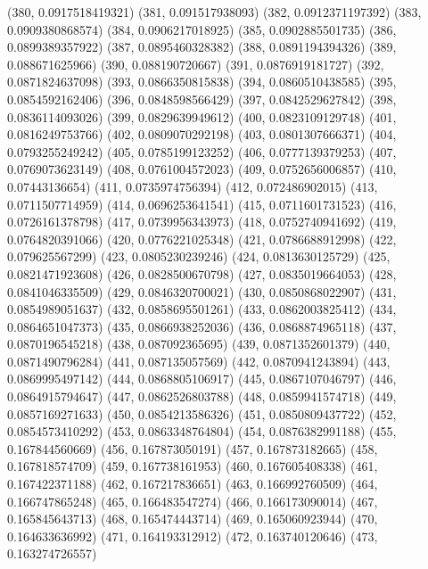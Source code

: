 {					(380, 0.0917518419321)
					(381, 0.091517938093)
					(382, 0.0912371197392)
					(383, 0.0909380868574)
					(384, 0.0906217018925)
					(385, 0.0902885501735)
					(386, 0.0899389357922)
					(387, 0.0895460328382)
					(388, 0.0891194394326)
					(389, 0.088671625966)
					(390, 0.088190720667)
					(391, 0.0876919181727)
					(392, 0.0871824637098)
					(393, 0.0866350815838)
					(394, 0.0860510438585)
					(395, 0.0854592162406)
					(396, 0.0848598566429)
					(397, 0.0842529627842)
					(398, 0.0836114093026)
					(399, 0.0829639949612)
					(400, 0.0823109129748)
					(401, 0.0816249753766)
					(402, 0.0809070292198)
					(403, 0.0801307666371)
					(404, 0.0793255249242)
					(405, 0.0785199123252)
					(406, 0.0777139379253)
					(407, 0.0769073623149)
					(408, 0.0761004572023)
					(409, 0.0752656006857)
					(410, 0.07443136654)
					(411, 0.0735974756394)
					(412, 0.072486902015)
					(413, 0.0711507714959)
					(414, 0.0696253641541)
					(415, 0.0711601731523)
					(416, 0.0726161378798)
					(417, 0.0739956343973)
					(418, 0.0752740941692)
					(419, 0.0764820391066)
					(420, 0.0776221025348)
					(421, 0.0786688912998)
					(422, 0.079625567299)
					(423, 0.0805230239246)
					(424, 0.0813630125729)
					(425, 0.0821471923608)
					(426, 0.0828500670798)
					(427, 0.0835019664053)
					(428, 0.0841046335509)
					(429, 0.0846320700021)
					(430, 0.0850868022907)
					(431, 0.0854989051637)
					(432, 0.0858695501261)
					(433, 0.0862003825412)
					(434, 0.0864651047373)
					(435, 0.0866938252036)
					(436, 0.0868874965118)
					(437, 0.0870196545218)
					(438, 0.087092365695)
					(439, 0.0871352601379)
					(440, 0.0871490796284)
					(441, 0.087135057569)
					(442, 0.0870941243894)
					(443, 0.0869995497142)
					(444, 0.0868805106917)
					(445, 0.0867107046797)
					(446, 0.0864915794647)
					(447, 0.0862526803788)
					(448, 0.0859941574718)
					(449, 0.0857169271633)
					(450, 0.0854213586326)
					(451, 0.0850809437722)
					(452, 0.0854573410292)
					(453, 0.0863348764804)
					(454, 0.0876382991188)
					(455, 0.167844560669)
					(456, 0.167873050191)
					(457, 0.167873182665)
					(458, 0.167818574709)
					(459, 0.167738161953)
					(460, 0.167605408338)
					(461, 0.167422371188)
					(462, 0.167217836651)
					(463, 0.166992760509)
					(464, 0.166747865248)
					(465, 0.166483547274)
					(466, 0.166173090014)
					(467, 0.165845643713)
					(468, 0.165474443714)
					(469, 0.165060923944)
					(470, 0.164633636992)
					(471, 0.164193312912)
					(472, 0.163740120646)
					(473, 0.163274726557)
}
